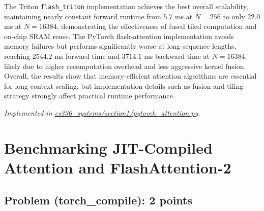 \documentclass[letterpaper]{article}
\newcommand{\repofile}[2]{\href{https://github.com/echung32/ece405-assignment4-hpc/blob/main/#1}{#2}}
\begin{document}
\begin{itemize}
		The Triton \texttt{flash\_triton} implementation achieves the best overall scalability, maintaining nearly constant forward runtime from \(5.7\) ms at \(N=256\) to only \(22.0\) ms at \(N=16384\), demonstrating the effectiveness of fused tiled computation and on-chip SRAM reuse. The PyTorch flash-attention implementation avoids memory failures but performs significantly worse at long sequence lengths, reaching \(2544.2\) ms forward time and \(3714.1\) ms backward time at \(N=16384\), likely due to higher recomputation overhead and less aggressive kernel fusion. Overall, the results show that memory-efficient attention algorithms are essential for long-context scaling, but implementation details such as fusion and tiling strategy strongly affect practical runtime performance.
		
	\end{itemize}
	
	\textit{Implemented in \repofile{cs336_systems/section1/pytorch_attention.py}{cs336\_systems/section1/pytorch\_attention.py}.}
	
	\section{Benchmarking JIT-Compiled Attention and FlashAttention-2}
	
	\subsection{Problem (torch\_compile): 2 points}
	
\end{document}
